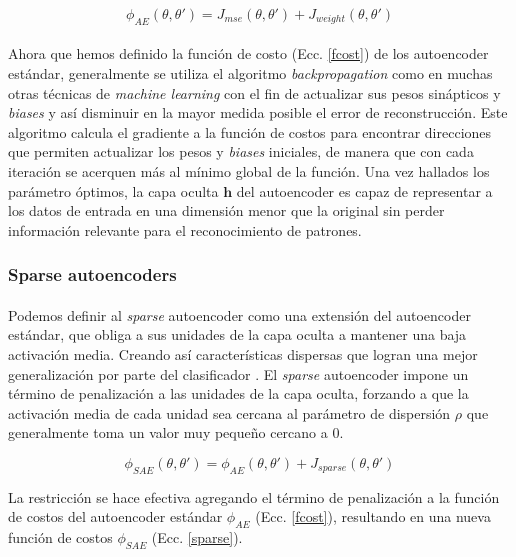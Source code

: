 \documentclass[12pt]{article}%
\begin{document}
\begin{equation}
\label{fcost}
\phi_{AE}(\theta,\theta')= J_{mse}(\theta,\theta') + J_{weight}(\theta,\theta')
\end{equation} 

\paragraph{}
Ahora que hemos definido la función de costo (Ecc. \ref{fcost}) de los autoencoder estándar, generalmente se utiliza el algoritmo \textit{backpropagation} como en muchas otras técnicas de \textit{machine learning} con el fin de actualizar sus pesos sinápticos y \textit{biases} y así disminuir en la mayor medida posible el error de reconstrucción. Este algoritmo calcula el gradiente a la función de costos para encontrar direcciones que permiten actualizar los pesos y \textit{biases} iniciales, de manera que con cada iteración se acerquen más al mínimo global de la función. Una vez hallados los parámetro óptimos, la capa oculta $\textbf{h}$ del autoencoder es capaz de representar a los datos de entrada en una dimensión menor que la original sin perder información relevante para el reconocimiento de patrones.

\subsubsection{Sparse autoencoders}

\paragraph{}
Podemos definir al \textit{sparse} autoencoder como una extensión del autoencoder estándar, que obliga a sus unidades de la capa oculta a mantener una baja activación media. Creando así características dispersas que logran una mejor generalización por parte del clasificador \cite{du}. El \textit{sparse} autoencoder impone un término de penalización a las unidades de la capa oculta, forzando a que la activación media de cada unidad sea cercana al parámetro de dispersión $\rho$ que generalmente toma un valor muy pequeño cercano a 0. 

\begin{equation}
\label{sparse}
\phi_{SAE}(\theta,\theta')=\phi_{AE}(\theta,\theta')+J_{sparse}(\theta,\theta')
\end{equation}

La restricción se hace efectiva agregando el término de penalización a la función de costos del autoencoder estándar $\phi_{AE}$ (Ecc. \ref{fcost}), resultando en una nueva función de costos $\phi_{SAE}$ (Ecc. \ref{sparse}).
\end{document}
